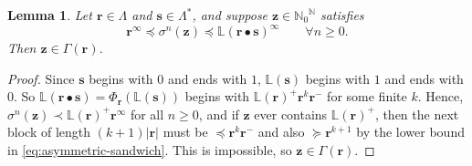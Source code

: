\documentclass[11pt]{amsart}
\newtheorem{lemma}[theorem]{Lemma}
\theoremstyle{definition}
\theoremstyle{remark}
\numberwithin{equation}{section}
\newcommand{\N}{\ensuremath{\mathbb{N}}}
\renewcommand{\L}{\ensuremath{\mathbb{L}}}
\newcommand{\s}{ {\mathbf{s}}}
\renewcommand{\r}{ {\mathbf{r}}}
\newcommand{\z}{\mathbf{z}}
\newcommand{\Ga}{\Gamma}
\newcommand{\f}{\infty}
\newcommand{\lle}{\preccurlyeq}
\newcommand{\lge}{\succcurlyeq}
\newcommand{\La}{\Lambda}
\begin{document}
\begin{lemma} \label{lem:equivalent-upper-bound}
Let { $\r\in\La$ and $\s\in\La^*$}, and suppose $\z\in{\N_0}^\N$ satisfies
\begin{equation} \label{eq:asymmetric-sandwich}
\r^\f\lle \sigma^n(\z)\lle {\L(\r\bullet\s)^\f}\qquad\forall n\geq 0.
\end{equation}
Then $\z\in\Ga(\r)$.
\end{lemma}

\begin{proof}
{Since $\s$ begins with $0$ and ends with $1$, $\L(\s)$ begins with $1$ and ends with $0$. So $\L(\r\bullet\s)=\Phi_\r(\L(\s))$} begins with $\L(\r)^+\r^k\r^-$ for some finite $k$. Hence, $\sigma^n(\z)\prec \L(\r)^+{\r}^\f$ for all $n\geq 0$, and if $\z$ ever contains $\L(\r)^+$, then the next block of length $(k+1)|\r|$ must be $\lle \r^k\r^-$ and also $\lge \r^{k+1}$ by the lower bound in \eqref{eq:asymmetric-sandwich}. This is impossible, so $\z\in\Ga(\r)$.
\end{proof}
\end{document}
